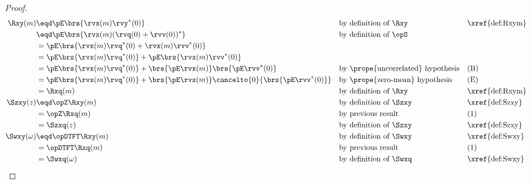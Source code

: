 \begin{proof}
\begin{align*}
  \Rxy(m)
    &\eqd \pE\brs{\rvx(m)\rvy^\ast(0)}
    && \text{by definition of $\Rxy$}
    && \text{\xref{def:Rxym}}
  \\&\eqd \pE\brs{\rvx(m)(\rvq(0)+\rvv(0))^\ast}
    && \text{by definition of $\opS$}
  \\&= \pE\brs{\rvx(m)\rvq^\ast(0)+\rvx(m)\rvv^\ast(0)}
  \\&= \pE\brs{\rvx(m)\rvq^\ast(0)} + \pE\brs{\rvx(m)\rvv^\ast(0)}
  \\&= \pE\brs{\rvx(m)\rvq^\ast(0)} + \brs{\pE\rvx(m)}\brs{\pE\rvv^\ast(0)}
    && \text{by \prope{uncorrelated} hypothesis}
    && \text{(B)}
  \\&= \pE\brs{\rvx(m)\rvq^\ast(0)} + \brs{\pE\rvx(m)}\cancelto{0}{\brs{\pE\rvv^\ast(0)}}
    && \text{by \prope{zero-mean} hypothesis}
    && \text{(E)}
  \\&= \Rxq(m)
    && \text{by definition of $\Rxy$}
    && \text{\xref{def:Rxym}}
  \\
  \Szxy(z)
    &\eqd \opZ\Rxy(m)
    && \text{by definition of $\Szxy$}
    && \text{\xref{def:Szxy}}
  \\&= \opZ\Rxq(m)
    && \text{by previous result}
    && \text{(1)}
  \\&= \Szxq(z)
    && \text{by definition of $\Szxy$}
    && \text{\xref{def:Szxy}}
  \\
  \Swxy(\omega)
    &\eqd \opDTFT\Rxy(m)
    && \text{by definition of $\Swxy$}
    && \text{\xref{def:Swxy}}
  \\&= \opDTFT\Rxq(m)
    && \text{by previous result}
    && \text{(1)}
  \\&= \Swxq(\omega)
    && \text{by definition of $\Swxq$}
    && \text{\xref{def:Swxy}}
\end{align*}
\end{proof}

